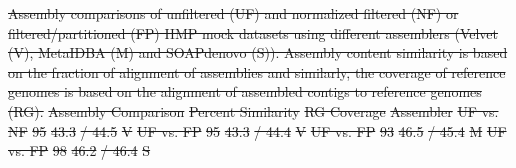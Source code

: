 \documentclass{pnastwo}
\providecommand{\DIFdel}[1]{{\protect\color{red}\sout{#1}}}                      %
\providecommand{\DIFdelFL}[1]{\DIFdel{#1}} %
\providecommand{\DIFdelbeginFL}{} %
\begin{document}
\begin{table}
\DIFdelbeginFL %
{%
\DIFdelFL{Assembly comparisons of unfiltered (UF) and normalized filtered (NF) or
  filtered/partitioned (FP) HMP mock datasets using different
  assemblers (Velvet (V), MetaIDBA (M) and SOAPdenovo (S)).  Assembly
  content similarity is based on the fraction of alignment of
  assemblies and similarly, the coverage of reference genomes is based
  on the alignment of assembled contigs to reference genomes (RG).}}
\DIFdelFL{Assembly Comparison }%
\DIFdelFL{Percent Similarity }%
\DIFdelFL{RG Coverage }%
\DIFdelFL{Assembler }%
\DIFdelFL{UF vs. NF }%
\DIFdelFL{95}%
\DIFdelFL{43.3}%
\DIFdelFL{/ 44.5}%
\DIFdelFL{V }%
\DIFdelFL{UF vs. FP }%
\DIFdelFL{95}%
\DIFdelFL{43.3}%
\DIFdelFL{/ 44.4}%
\DIFdelFL{V}%
\DIFdelFL{UF vs. FP }%
\DIFdelFL{93}%
\DIFdelFL{46.5}%
\DIFdelFL{/ 45.4}%
\DIFdelFL{M}%
\DIFdelFL{UF vs. FP }%
\DIFdelFL{98}%
\DIFdelFL{46.2}%
\DIFdelFL{/ 46.4}%
\DIFdelFL{S}%


\end{table}
\end{document}
